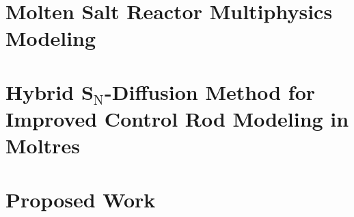 \documentclass[edeposit,fullpage,11pt]{uiucthesis2021}
\begin{document}
\chapter{Molten Salt Reactor Multiphysics Modeling}
\label{chap:lit}

\glsresetall
%
%
%
%

\chapter{Hybrid S$_\text{N}$-Diffusion Method for Improved Control Rod Modeling
in Moltres}
\label{chap:hybrid}

\glsresetall

\chapter{Proposed Work}
\label{chap:proposedwork}

\glsresetall

\backmatter



\end{document}
